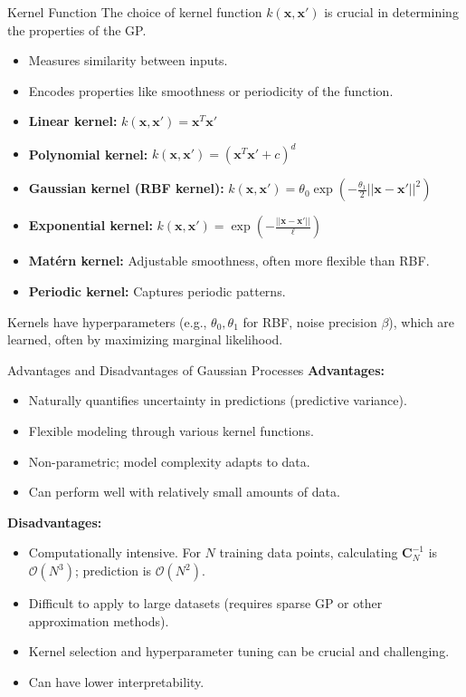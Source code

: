 \documentclass{beamer} %
\newcommand{\mat}[1]{\mathbf{#1}}
\newcommand{\vect}[1]{\mathbf{#1}}
\begin{document}
\begin{frame}{Kernel Function}
  The choice of kernel function $k(\vect{x}, \vect{x}')$ is crucial in determining the properties of the GP.
  \begin{itemize}
    \item Measures similarity between inputs.
    \item Encodes properties like smoothness or periodicity of the function.
  \end{itemize}
  \begin{exm}
  \begin{itemize}
    \item \textbf{Linear kernel:} $k(\vect{x}, \vect{x}') = \vect{x}^T \vect{x}'$
    \item \textbf{Polynomial kernel:} $k(\vect{x}, \vect{x}') = (\vect{x}^T \vect{x}' + c)^d$
    \item \textbf{Gaussian kernel (RBF kernel):} $k(\vect{x}, \vect{x}') = \theta_0 \exp\left(-\frac{\theta_1}{2}||\vect{x} - \vect{x}'||^2\right)$
    \item \textbf{Exponential kernel:} $k(\vect{x}, \vect{x}') = \exp\left(-\frac{||\vect{x} - \vect{x}'||}{\ell}\right)$
    \item \textbf{Matérn kernel:} Adjustable smoothness, often more flexible than RBF.
    \item \textbf{Periodic kernel:} Captures periodic patterns.
  \end{itemize}
  \end{exm}
  Kernels have hyperparameters (e.g., $\theta_0, \theta_1$ for RBF, noise precision $\beta$), which are learned, often by maximizing marginal likelihood.
\end{frame}

\begin{frame}{Advantages and Disadvantages of Gaussian Processes}
  \textbf{Advantages:}
  \begin{itemize}
    \item Naturally quantifies uncertainty in predictions (predictive variance).
    \item Flexible modeling through various kernel functions.
    \item Non-parametric; model complexity adapts to data.
    \item Can perform well with relatively small amounts of data.
  \end{itemize}
  \textbf{Disadvantages:}
  \begin{itemize}
    \item Computationally intensive. For $N$ training data points, calculating $\mat{C}_N^{-1}$ is $\mathcal{O}(N^3)$; prediction is $\mathcal{O}(N^2)$.
    \item Difficult to apply to large datasets (requires sparse GP or other approximation methods).
    \item Kernel selection and hyperparameter tuning can be crucial and challenging.
    \item Can have lower interpretability.
  \end{itemize}
\end{frame}
\end{document}
